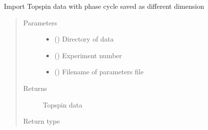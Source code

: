 \documentclass[letterpaper,10pt,english]{sphinxmanual}
\begin{document}
\begin{fulllineitems}
\label{\detokenize{dnpImport:dnpLab.dnpImport.topspin.topspin_ser_phase_cycle}}
Import Topspin data with phase cycle saved as different dimension
\begin{quote}\begin{description}
\item[{Parameters}] \leavevmode\begin{itemize}
\item {} 
 () \sphinxhyphen{}\sphinxhyphen{} Directory of data

\item {} 
 () \sphinxhyphen{}\sphinxhyphen{} Experiment number

\item {} 
 () \sphinxhyphen{}\sphinxhyphen{} Filename of parameters file

\end{itemize}

\item[{Returns}] \leavevmode
Topspin data

\item[{Return type}] \leavevmode
{\hyperref[\detokenize{dnpData:dnpLab.dnpdata}]{}}

\end{description}\end{quote}

\end{fulllineitems}

\end{document}
